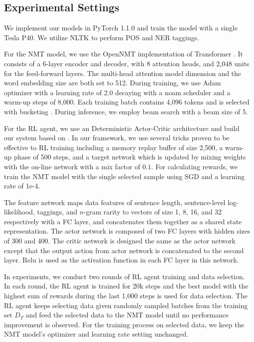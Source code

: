 \documentclass[letterpaper]{article}
\begin{document}
\subsection{Experimental Settings}
We implement our models in PyTorch 1.1.0 \cite{paszke2017pytorch} and train the model with a single Tesla P40. We utilize NLTK \cite{bird2009natural} to perform POS and NER taggings.

For the NMT model, we use the OpenNMT implementation \cite{opennmt} of Transformer \cite{vaswani2017attention}. It consists of a 6-layer encoder and decoder, with 8 attention heads, and 2,048 units for the feed-forward layers. The multi-head attention model dimension and the word embedding size are both set to 512. During training, we use Adam optimizer \cite{kingma2015adam} with a learning rate of 2.0 decaying with a noam scheduler and a warm-up steps of 8,000. Each training batch contains 4,096 tokens and is selected with bucketing \cite{kocmi2017curriculum}. During inference, we employ beam search with a beam size of 5.

For the RL agent, we use an Deterministic Actor-Critic architecture and build our system based on \cite{deeprl}. In our framework, we use several tricks proven to be effective to RL training including a memory replay buffer of size 2,500, a warm-up phase of 500 steps, and a target network which is updated by mixing weights with the on-line network with a mix factor of $0.1$. For calculating rewards, we train the NMT model with the single selected sample using SGD and a learning rate of 1e-4.

The feature network maps data features of sentence length, sentence-level log-likelihood, taggings, and $n$-gram rarity to vectors of size 1, 8, 16, and 32 respectively with a FC layer, and concatenates them together as a shared state representation. The actor network is composed of two FC layers with hidden sizes of 300 and 400. The critic network is designed the same as the actor network except that the output action from actor network is concatenated to the second layer. Relu is used as the activation function in each FC layer in this network.

In experiments, we conduct two rounds of RL agent training and data selection. In each round, the RL agent is trained for 20k steps and the best model with the highest sum of rewards during the last 1,000 steps is used for data selection. The RL agent keeps selecting data given randomly sampled batches from the training set $D_T$ and feed the selected data to the NMT model until no performance improvement is observed. For the training process on selected data, we keep the NMT model's optimizer and learning rate setting unchanged.
\end{document}
